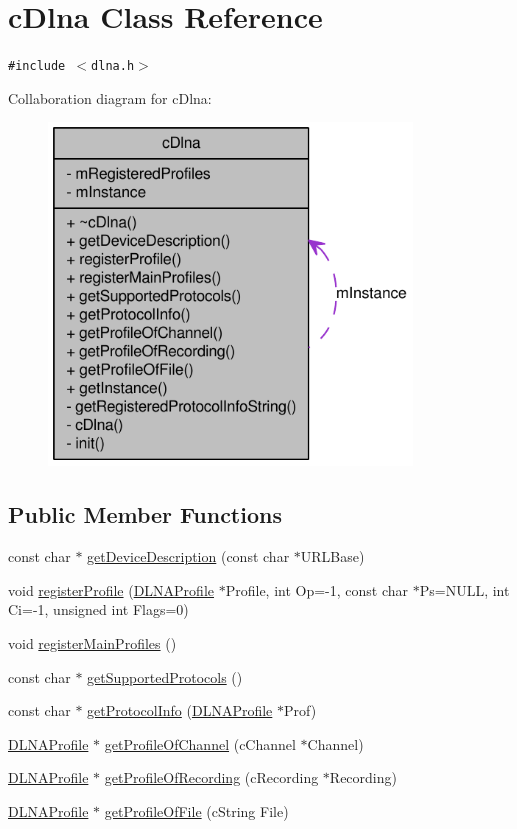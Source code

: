 \hypertarget{classcDlna}{
\section{cDlna Class Reference}
\label{classcDlna}
}
{\tt \#include $<$dlna.h$>$}

Collaboration diagram for cDlna:\nopagebreak
\begin{figure}[H]
\begin{center}
\leavevmode
\includegraphics[width=274pt]{classcDlna__coll__graph}
\end{center}
\end{figure}
\subsection*{Public Member Functions}
\begin{CompactItemize}
\item 
const char $\ast$ \hyperlink{classcDlna_a7ae0cc7b651bc6ccd82ef5da527d09a}{getDeviceDescription} (const char $\ast$URLBase)
\item 
void \hyperlink{classcDlna_0250d3903e7dcbdc8ebadfacd4e6fb50}{registerProfile} (\hyperlink{structDLNAProfile}{DLNAProfile} $\ast$Profile, int Op=-1, const char $\ast$Ps=NULL, int Ci=-1, unsigned int Flags=0)
\item 
void \hyperlink{classcDlna_e26b723ec63a60f397ce41bd95641dfa}{registerMainProfiles} ()
\item 
const char $\ast$ \hyperlink{classcDlna_68a9565f022c7037c51ad337274d8c3a}{getSupportedProtocols} ()
\item 
const char $\ast$ \hyperlink{classcDlna_992777f6c75dadd61bed6a75e03f1dfd}{getProtocolInfo} (\hyperlink{structDLNAProfile}{DLNAProfile} $\ast$Prof)
\item 
\hyperlink{structDLNAProfile}{DLNAProfile} $\ast$ \hyperlink{classcDlna_4eacc299d19fa20beba98d88d4230388}{getProfileOfChannel} (cChannel $\ast$Channel)
\item 
\hyperlink{structDLNAProfile}{DLNAProfile} $\ast$ \hyperlink{classcDlna_69dc71fe30130cafa399bb851ef5def8}{getProfileOfRecording} (cRecording $\ast$Recording)
\item 
\hyperlink{structDLNAProfile}{DLNAProfile} $\ast$ \hyperlink{classcDlna_4b5c30f707060b66c3980af70b7d8d08}{getProfileOfFile} (cString File)
\end{CompactItemize}
